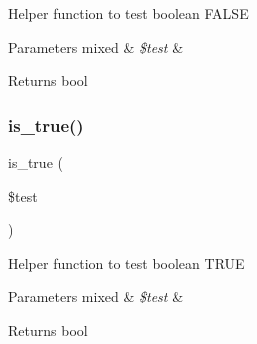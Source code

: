 Helper function to test boolean F\+A\+L\+SE


\begin{DoxyParams}[1]{Parameters}
mixed & {\em \$test} & \\
\hline
\end{DoxyParams}
\begin{DoxyReturn}{Returns}
bool 
\end{DoxyReturn}
\mbox{\label{_unit__test_8php_acf75638429e85f5d2eb23c85ce46f85b}} 
\subsubsection{\texorpdfstring{is\+\_\+true()}{is\_true()}}
{\footnotesize\ttfamily is\+\_\+true (\begin{DoxyParamCaption}\item[{}]{\$test }\end{DoxyParamCaption})}

Helper function to test boolean T\+R\+UE


\begin{DoxyParams}[1]{Parameters}
mixed & {\em \$test} & \\
\hline
\end{DoxyParams}
\begin{DoxyReturn}{Returns}
bool 
\end{DoxyReturn}
